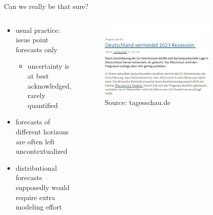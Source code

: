 \documentclass[en]{sdqbeamer}
\begin{document}
\begin{frame}[t]{Can we really be that sure?}

\begin{columns}
\begin{column}{0.4\textwidth}
   	\begin{itemize}
         \item usual practice: issue point forecasts only
         \begin{itemize}
	    \item uncertainty is at best acknowledged, rarely quantified
	\end{itemize}
        \item forecasts of different horizons are often left uncontextualized
        \item distributional forecasts supposedly would require extra modeling effort
    \end{itemize}
    \vspace{2cm}
\end{column}
\begin{column}{0.6\textwidth}
    \begin{figure}
        \centering
        \includegraphics[width=0.8\textwidth]{figures/recession_light_underlined_green_smaller_date.jpg} 
        \caption{Source: tagesschau.de}
        \label{fig:enter-label}
    \end{figure}     
\end{column}
\end{columns}
\end{frame}
\end{document}
